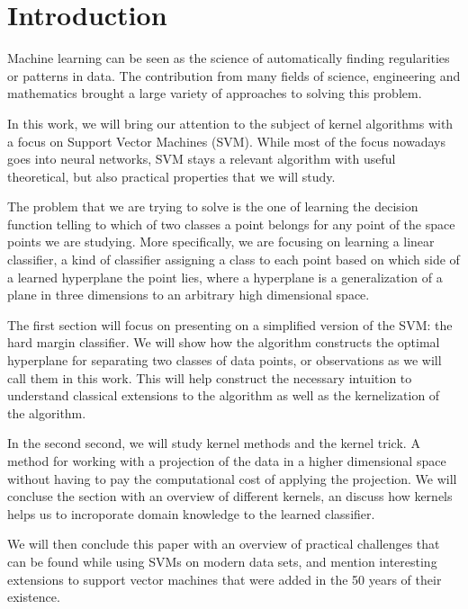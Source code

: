 \section{Introduction}

Machine learning can be seen as the science of automatically finding regularities or patterns in data. The contribution from many fields of science, engineering and mathematics brought a large variety of approaches to solving this problem.

In this work, we will bring our attention to the subject of kernel algorithms with a focus on Support Vector Machines (SVM). While most of the focus nowadays goes into neural networks, SVM stays a relevant algorithm with useful theoretical, but also practical properties that we will study.

The problem that we are trying to solve is the one of learning the decision function telling to which of two classes a point belongs for any point of the space points we are studying. More specifically, we are focusing on learning a linear classifier, a kind of classifier assigning a class to each point based on which side of a learned hyperplane the point lies, where a hyperplane is a generalization of a plane in three dimensions to an arbitrary high dimensional space.

The first section will focus on presenting on a simplified version of the SVM: the hard margin classifier. We will show how the algorithm constructs the optimal hyperplane for separating two classes of data points, or observations as we will call them in this work. This will help construct the necessary intuition to understand classical extensions to the algorithm as well as the kernelization of the algorithm.

In the second second, we will study kernel methods and the kernel trick. A method for working with a projection of the data in a higher dimensional space without having to pay the computational cost of applying the projection. We will concluse the section with an overview of different kernels, an discuss how kernels helps us to incroporate domain knowledge to the learned classifier.

We will then conclude this paper with an overview of practical challenges that can be found while using SVMs on modern data sets, and mention interesting extensions to support vector machines that were added in the 50 years of their existence.

